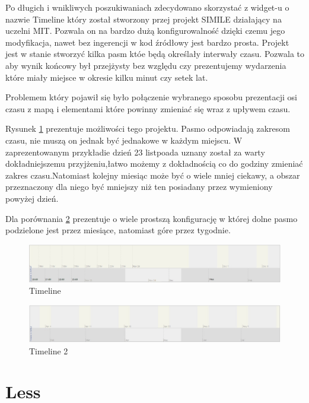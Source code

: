 Po długich i wnikliwych poszukiwaniach zdecydowano skorzystać z widget-u o nazwie Timeline który został stworzony przej projekt SIMILE działający na uczelni MIT. Pozwala on na bardzo dużą konfigurowalność dzięki czemu jego modyfikacja, nawet bez ingerencji w kod źródłowy jest bardzo prosta.
Projekt jest w stanie stworzyć kilka pasm któe będą określały interwały czasu. Pozwala to aby wynik końcowy był przejżysty bez względu czy prezentujemy wydarzenia które miały miejsce w okresie kilku minut czy setek lat.

Problemem który pojawił się było połączenie wybranego sposobu prezentacji osi czasu z mapą i elementami które powinny zmieniać się wraz z upływem czasu.

Rysunek \ref{fig:tm1} prezentuje możliwości tego projektu. Pasmo odpowiadają zakresom czasu, nie muszą on jednak być jednakowe w każdym miejscu. W zaprezentowanym przykładie dzień 23 listpoada uznany został za warty dokładniejszemu przyjżeniu,łatwo możemy z dokładnością co do godziny zmieniać zakres czasu.Natomiast kolejny miesiąc może być o wiele mniej ciekawy, a obszar przeznaczony dla niego być mniejszy niż ten posiadany przez wymieniony powyżej dzień.

Dla porównania \ref{fig:tm2} prezentuje o wiele prostszą konfigurację w której dolne pasmo podzielone jest przez miesiące, natomiast góre przez tygodnie.

  \begin{figure}[H]
  \centering
    \includegraphics[width=150mm]{ge/tm1.jpg}
  \caption{Timeline}
  \label{fig:tm1}
\end{figure}

  \begin{figure}[H]
  \centering
    \includegraphics[width=150mm]{ge/tm2.jpg}
  \caption{Timeline 2}
  \label{fig:tm2}
\end{figure}

\section{Less}
\label{sec:less}

